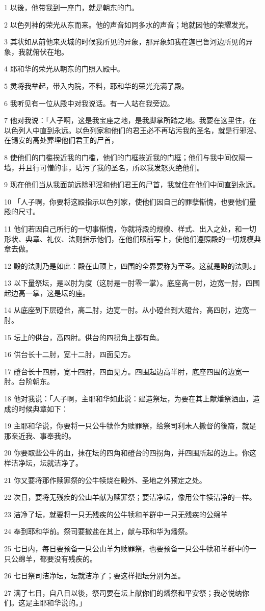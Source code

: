 \par 1 以後，他带我到一座门，就是朝东的门。
\par 2 以色列神的荣光从东而来。他的声音如同多水的声音；地就因他的荣耀发光。
\par 3 其状如从前他来灭城的时候我所见的异象，那异象如我在迦巴鲁河边所见的异象，我就俯伏在地。
\par 4 耶和华的荣光从朝东的门照入殿中。
\par 5 灵将我举起，带入内院，不料，耶和华的荣光充满了殿。
\par 6 我听见有一位从殿中对我说话。有一人站在我旁边。
\par 7 他对我说：「人子啊，这是我宝座之地，是我脚掌所踏之地。我要在这里住，在以色列人中直到永远。以色列家和他们的君王必不再玷污我的圣名，就是行邪淫、在锡安的高处葬埋他们君王的尸首，
\par 8 使他们的门槛挨近我的门槛，他们的门框挨近我的门框；他们与我中间仅隔一墙，并且行可憎的事，玷污了我的圣名，所以我发怒灭绝他们。
\par 9 现在他们当从我面前远除邪淫和他们君王的尸首，我就住在他们中间直到永远。
\par 10 「人子啊，你要将这殿指示以色列家，使他们因自己的罪孽惭愧，也要他们量殿的尺寸。
\par 11 他们若因自己所行的一切事惭愧，你就将殿的规模、样式、出入之处，和一切形状、典章、礼仪、法则指示他们，在他们眼前写上，使他们遵照殿的一切规模典章去做。
\par 12 殿的法则乃是如此：殿在山顶上，四围的全界要称为至圣。这就是殿的法则。」
\par 13 以下量祭坛，是以肘为度（这肘是一肘零一掌）。底座高一肘，边宽一肘，四围起边高一掌，这是坛的座。
\par 14 从底座到下层磴台，高二肘，边宽一肘。从小磴台到大磴台，高四肘，边宽一肘。
\par 15 坛上的供台，高四肘。供台的四拐角上都有角。
\par 16 供台长十二肘，宽十二肘，四面见方。
\par 17 磴台长十四肘，宽十四肘，四面见方。四围起边高半肘，底座四围的边宽一肘。台阶朝东。
\par 18 他对我说：「人子啊，主耶和华如此说：建造祭坛，为要在其上献燔祭洒血，造成的时候典章如下：
\par 19 主耶和华说，你要将一只公牛犊作为赎罪祭，给祭司利未人撒督的後裔，就是那亲近我、事奉我的。
\par 20 你要取些公牛的血，抹在坛的四角和磴台的四拐角，并四围所起的边上。你这样洁净坛，坛就洁净了。
\par 21 你又要将那作赎罪祭的公牛犊烧在殿外、圣地之外预定之处。
\par 22 次日，要将无残疾的公山羊献为赎罪祭；要洁净坛，像用公牛犊洁净的一样。
\par 23 洁净了坛，就要将一只无残疾的公牛犊和羊群中一只无残疾的公绵羊
\par 24 奉到耶和华前。祭司要撒盐在其上，献与耶和华为燔祭。
\par 25 七日内，每日要预备一只公山羊为赎罪祭，也要预备一只公牛犊和羊群中的一只公绵羊，都要没有残疾的。
\par 26 七日祭司洁净坛，坛就洁净了；要这样把坛分别为圣。
\par 27 满了七日，自八日以後，祭司要在坛上献你们的燔祭和平安祭；我必悦纳你们。这是主耶和华说的。」

